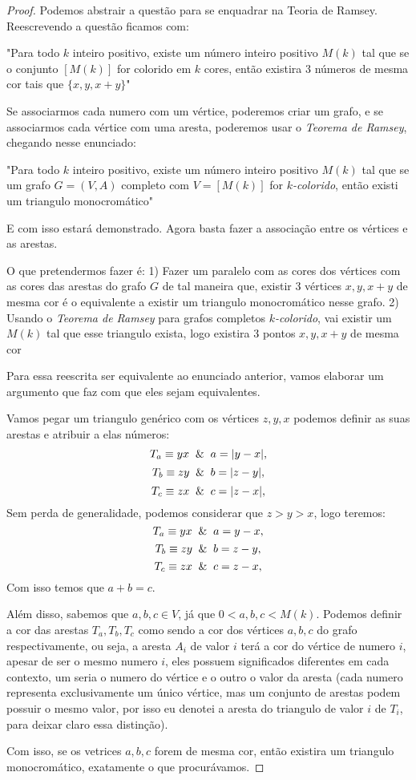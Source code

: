 \documentclass{article}
\begin{document}
\begin{proof}
    Podemos abstrair a questão para se enquadrar na Teoria de Ramsey. Reescrevendo a questão ficamos com:

    "Para todo $k$ inteiro positivo, existe um número inteiro positivo $M(k)$ tal que se o conjunto $[M(k)]$ for colorido em $k$ cores, então existira $3$ números de mesma cor tais que $\{x, y, x+y\}$"

    Se associarmos cada numero com um vértice, poderemos criar um grafo, e se associarmos cada vértice com uma aresta, poderemos usar o \emph{Teorema de Ramsey}, chegando nesse enunciado:

    "Para todo $k$ inteiro positivo, existe um número inteiro positivo $M(k)$ tal que se um grafo $G = (V, A)$ completo com $V = [M(k)]$ for $k$\emph{-colorido}, então existi um triangulo monocromático"

    E com isso estará demonstrado. Agora basta fazer a associação entre os vértices e as arestas.

    O que pretendermos fazer é:
    1) Fazer um paralelo com as cores dos vértices com as cores das arestas do grafo $G$ de tal maneira que, existir 3 vértices $x, y, x+y$ de mesma cor é o equivalente a existir um triangulo monocromático nesse grafo.
    2) Usando o \emph{Teorema de Ramsey} para grafos completos $k$\emph{-colorido}, vai existir um $M(k)$ tal que esse triangulo exista, logo existira 3 pontos $x, y, x+y$ de mesma cor

    Para essa reescrita ser equivalente ao enunciado anterior, vamos elaborar um argumento que faz com que eles sejam equivalentes.

    Vamos pegar um triangulo genérico com os vértices $z, y, x$ podemos definir as suas arestas e atribuir a elas números:
    \[T_a \equiv yx \And a = |y-x|,\]
    \[T_b \equiv zy \And b = |z-y|,\]
    \[T_c \equiv zx \And c = |z-x|,\]
    Sem perda de generalidade, podemos considerar que $z > y > x$, logo teremos:
    \[T_a \equiv yx \And a = y-x,\]
    \[T_b \equiv zy \And b = z-y,\]
    \[T_c \equiv zx \And c = z-x,\]
    Com isso temos que $a + b = c$.

    Além disso, sabemos que $a, b, c \in V$, já que $0 < a, b, c < M(k)$. Podemos definir a cor das arestas $T_a, T_b, T_c$ como sendo a cor dos vértices $a, b, c$ do grafo respectivamente, ou seja, a aresta $A_i$ de valor $i$ terá a cor do vértice de numero $i$, apesar de ser o mesmo numero $i$, eles possuem significados diferentes em cada contexto, um seria o numero do vértice e o outro o valor da aresta (cada numero representa exclusivamente um único vértice, mas um conjunto de arestas podem possuir o mesmo valor, por isso eu denotei a aresta do triangulo de valor $i$ de $T_i$, para deixar claro essa distinção).

    Com isso, se os vetrices $a, b, c$ forem de mesma cor, então existira um triangulo monocromático, exatamente o que procurávamos.
\end{proof}
\end{document}

